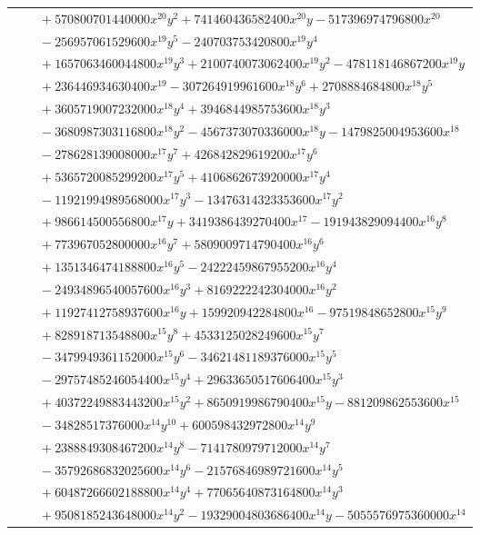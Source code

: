 \documentclass[11pt]{article}
\begin{document}
\begin{longtable}{@{}ll@{}}
 & $\quad +570800701440000x^{20}y^{2}+741460436582400x^{20}y-517396974796800x^{20}$\\
 & $\quad -256957061529600x^{19}y^{5}-240703753420800x^{19}y^{4}$\\
 & $\quad +1657063460044800x^{19}y^{3}+2100740073062400x^{19}y^{2}-478118146867200x^{19}y$\\
 & $\quad +236446934630400x^{19}-307264919961600x^{18}y^{6}+2708884684800x^{18}y^{5}$\\
 & $\quad +3605719007232000x^{18}y^{4}+3946844985753600x^{18}y^{3}$\\
 & $\quad -3680987303116800x^{18}y^{2}-4567373070336000x^{18}y-1479825004953600x^{18}$\\
 & $\quad -278628139008000x^{17}y^{7}+426842829619200x^{17}y^{6}$\\
 & $\quad +5365720085299200x^{17}y^{5}+4106862673920000x^{17}y^{4}$\\
 & $\quad -11921994989568000x^{17}y^{3}-13476314323353600x^{17}y^{2}$\\
 & $\quad +986614500556800x^{17}y+3419386439270400x^{17}-191943829094400x^{16}y^{8}$\\
 & $\quad +773967052800000x^{16}y^{7}+5809009714790400x^{16}y^{6}$\\
 & $\quad +1351346474188800x^{16}y^{5}-24222459867955200x^{16}y^{4}$\\
 & $\quad -24934896540057600x^{16}y^{3}+8169222242304000x^{16}y^{2}$\\
 & $\quad +11927412758937600x^{16}y+159920942284800x^{16}-97519848652800x^{15}y^{9}$\\
 & $\quad +828918713548800x^{15}y^{8}+4533125028249600x^{15}y^{7}$\\
 & $\quad -3479949361152000x^{15}y^{6}-34621481189376000x^{15}y^{5}$\\
 & $\quad -29757485246054400x^{15}y^{4}+29633650517606400x^{15}y^{3}$\\
 & $\quad +40372249883443200x^{15}y^{2}+8650919986790400x^{15}y-881209862553600x^{15}$\\
 & $\quad -34828517376000x^{14}y^{10}+600598432972800x^{14}y^{9}$\\
 & $\quad +2388849308467200x^{14}y^{8}-7141780979712000x^{14}y^{7}$\\
 & $\quad -35792686832025600x^{14}y^{6}-21576846989721600x^{14}y^{5}$\\
 & $\quad +60487266602188800x^{14}y^{4}+77065640873164800x^{14}y^{3}$\\
 & $\quad +9508185243648000x^{14}y^{2}-19329004803686400x^{14}y-5055576975360000x^{14}$\\

\end{longtable}
\end{document}
